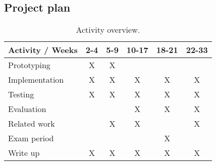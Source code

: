 \documentclass[preprint,10pt,numbers]{sigplanconf}
\begin{document}
  \subsection{Project plan}
  \begin{table}[H]
    \centering
    \begin{tabular}{ | l | c | c | c | c | c | }
      \hline
      \multicolumn{1}{|c|}{Activity / Weeks} & 2-4 & 5-9 & 10-17 & 18-21 & 22-33 \\
      \hline
      Prototyping    & X & X & & & \\
      \hline
      Implementation & X & X & X & X & X \\
      \hline
      Testing        & X & X & X & X & X \\
      \hline
      Evaluation     &   &   & X & X & X \\
      \hline
      Related work   &   & X & X &   & X \\
      \hline
      Exam period    &   &   &   & X &   \\
      \hline
      Write up       & X & X & X & X & X  \\
      \hline
    \end{tabular}\caption{Activity overview.}
  \end{table}

\softraggedright

\end{document}
